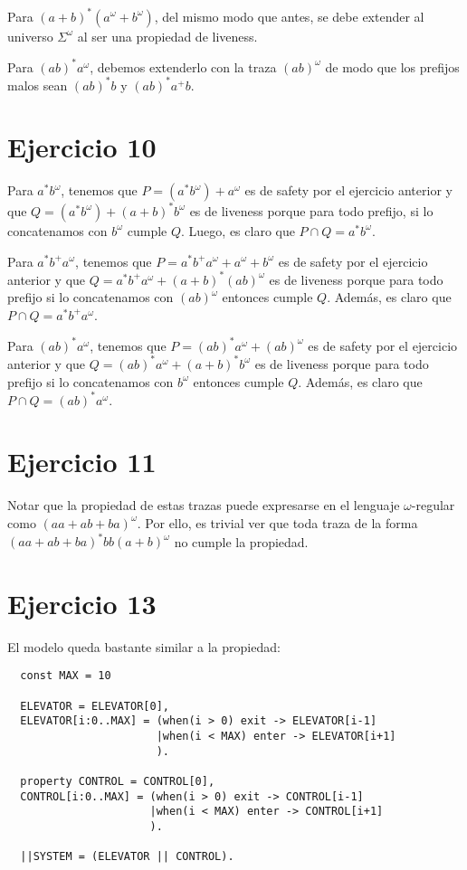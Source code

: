\documentclass{article}
\begin{document}
Para $(a+b)^*(a^\omega+b^\omega)$, del mismo modo que antes, se debe extender al universo $\Sigma^\omega$ al ser una propiedad de liveness.

Para $(ab)^*a^\omega$, debemos extenderlo con la traza $(ab)^\omega$ de modo que los prefijos malos sean $(ab)^*b$ y $(ab)^*a^+b$.

\section*{Ejercicio 10}
Para $a^*b^\omega$, tenemos que $P = (a^*b^\omega)+a^\omega$ es de safety por el ejercicio anterior y que $Q = (a^*b^\omega) + (a + b)^*b^\omega$ es de liveness porque para todo prefijo, si lo concatenamos con $b^\omega$ cumple $Q$.
Luego, es claro que $P \cap Q = a^*b^\omega$.

Para $a^*b^+a^\omega$, tenemos que $P = a^*b^+a^\omega + a^\omega + b^\omega$ es de safety por el ejercicio anterior y que $Q = a^*b^+a^\omega + (a + b)^*(ab)^\omega$ es de liveness porque para todo prefijo si lo concatenamos con $(ab)^\omega$ entonces cumple $Q$.
Además, es claro que $P \cap Q = a^*b^+a^\omega$.

Para $(ab)^*a^\omega$, tenemos que $P = (ab)^*a^\omega + (ab)^\omega$ es de safety por el ejercicio anterior y que $Q = (ab)^*a^\omega + (a + b)^*b^\omega$ es de liveness porque para todo prefijo si lo concatenamos con $b^\omega$ entonces cumple $Q$.
Además, es claro que $P \cap Q = (ab)^*a^\omega$.

\section*{Ejercicio 11}
Notar que la propiedad de estas trazas puede expresarse en el lenguaje $\omega$-regular como $(aa + ab + ba)^\omega$.
Por ello, es trivial ver que toda traza de la forma $(aa + ab + ba)^*bb(a + b)^\omega$ no cumple la propiedad.

\section*{Ejercicio 13}
El modelo queda bastante similar a la propiedad:
\begin{verbatim}
  const MAX = 10

  ELEVATOR = ELEVATOR[0],
  ELEVATOR[i:0..MAX] = (when(i > 0) exit -> ELEVATOR[i-1]
                       |when(i < MAX) enter -> ELEVATOR[i+1]
                       ).
  
  property CONTROL = CONTROL[0],
  CONTROL[i:0..MAX] = (when(i > 0) exit -> CONTROL[i-1]
                      |when(i < MAX) enter -> CONTROL[i+1]
                      ).

  ||SYSTEM = (ELEVATOR || CONTROL).
\end{verbatim}
\end{document}
